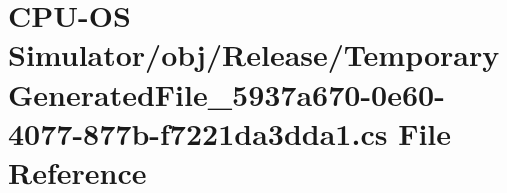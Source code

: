 \hypertarget{_o_s_01_simulator_2obj_2_release_2_temporary_generated_file__5937a670-0e60-4077-877b-f7221da3dda1_8cs}{}\section{C\+P\+U-\/\+O\+S Simulator/obj/\+Release/\+Temporary\+Generated\+File\+\_\+5937a670-\/0e60-\/4077-\/877b-\/f7221da3dda1.cs File Reference}
\label{_o_s_01_simulator_2obj_2_release_2_temporary_generated_file__5937a670-0e60-4077-877b-f7221da3dda1_8cs}
